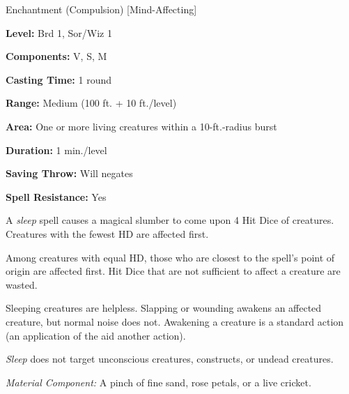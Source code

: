 
Enchantment (Compulsion) [Mind-Affecting]

\textbf{Level:} Brd 1, Sor/Wiz 1

\textbf{Components:} V, S, M

\textbf{Casting Time:} 1 round

\textbf{Range:} Medium (100 ft. + 10 ft./level)

\textbf{Area:} One or more living creatures within a 10-ft.-radius burst

\textbf{Duration:} 1 min./level

\textbf{Saving Throw:} Will negates

\textbf{Spell Resistance:} Yes

A \textit{sleep} spell causes a magical slumber to come upon 4 Hit Dice of creatures. 
Creatures with the fewest HD are affected first.

Among creatures with equal HD, those who are closest to the spell's point of origin 
are affected first. Hit Dice that are not sufficient to affect a creature are wasted.

Sleeping creatures are helpless. Slapping or wounding awakens an affected creature, 
but normal noise does not. Awakening a creature is a standard action (an application 
of the aid another action).

\textit{Sleep} does not target unconscious creatures, constructs, or undead creatures.

\textit{Material Component:} A pinch of fine sand, rose petals, or a live cricket.

